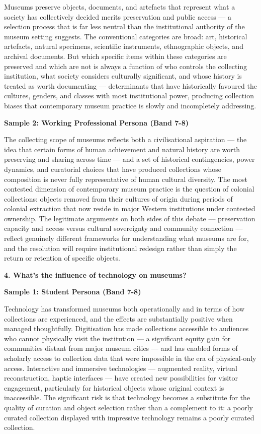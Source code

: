 Museums preserve objects, documents, and artefacts that represent what a society has collectively decided merits preservation and public access — a selection process that is far less neutral than the institutional authority of the museum setting suggests. The conventional categories are broad: art, historical artefacts, natural specimens, scientific instruments, ethnographic objects, and archival documents. But which specific items within these categories are preserved and which are not is always a function of who controls the collecting institution, what society considers culturally significant, and whose history is treated as worth documenting — determinants that have historically favoured the cultures, genders, and classes with most institutional power, producing collection biases that contemporary museum practice is slowly and incompletely addressing.

\textbf{Sample 2: Working Professional Persona (Band 7-8)}

The collecting scope of museums reflects both a civilisational aspiration — the idea that certain forms of human achievement and natural history are worth preserving and sharing across time — and a set of historical contingencies, power dynamics, and curatorial choices that have produced collections whose composition is never fully representative of human cultural diversity. The most contested dimension of contemporary museum practice is the question of colonial collections: objects removed from their cultures of origin during periods of colonial extraction that now reside in major Western institutions under contested ownership. The legitimate arguments on both sides of this debate — preservation capacity and access versus cultural sovereignty and community connection — reflect genuinely different frameworks for understanding what museums are for, and the resolution will require institutional redesign rather than simply the return or retention of specific objects.

\separator

\begin{ieltsquestion}
\textbf{4. What's the influence of technology on museums?}
\end{ieltsquestion}
\textbf{Sample 1: Student Persona (Band 7-8)}

Technology has transformed museums both operationally and in terms of how collections are experienced, and the effects are substantially positive when managed thoughtfully. Digitisation has made collections accessible to audiences who cannot physically visit the institution — a significant equity gain for communities distant from major museum cities — and has enabled forms of scholarly access to collection data that were impossible in the era of physical-only access. Interactive and immersive technologies — augmented reality, virtual reconstruction, haptic interfaces — have created new possibilities for visitor engagement, particularly for historical objects whose original context is inaccessible. The significant risk is that technology becomes a substitute for the quality of curation and object selection rather than a complement to it: a poorly curated collection displayed with impressive technology remains a poorly curated collection.

